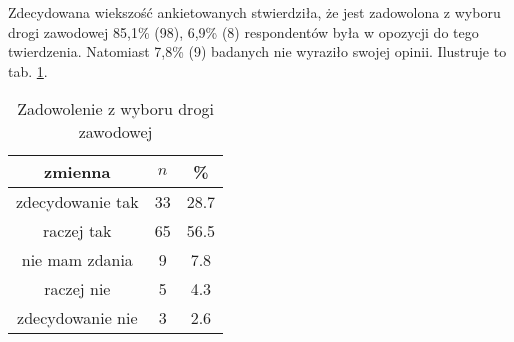 
Zdecydowana wiekszość ankietowanych stwierdziła, że jest zadowolona z wyboru drogi zawodowej 85,1\% (98), 6,9\% (8) respondentów była w opozycji do tego twierdzenia. Natomiast 7,8\% (9) badanych nie wyraziło swojej opinii. Ilustruje to tab. \ref{tab:Q5}.

\begin{table}[H]
\caption{Zadowolenie z wyboru drogi zawodowej}
\centering
\begin{tabular}{ | c | c | c |}
\hline
zmienna & $n$ & \% \\
\hline
zdecydowanie tak  &  33  & 28.7 \\
\hline
raczej tak  &  65  & 56.5\\
\hline
nie mam zdania  &  9  & 7.8 \\
\hline
raczej nie  &  5  & 4.3 \\
\hline
zdecydowanie nie  &  3  & 2.6 \\
\hline
\end{tabular}
\label{tab:Q5}
\end{table}

